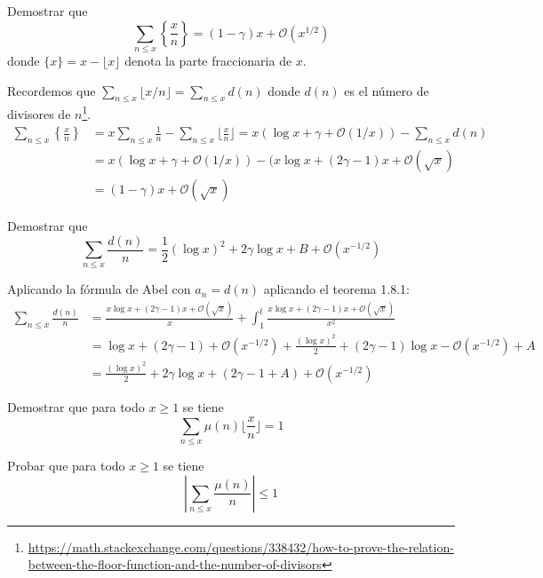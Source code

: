 \documentclass[twoside]{article}
\begin{document}
\begin{ejercicio}{4}
Demostrar que
\[ \sum_{n≤x} \left\{ \frac{x}{n} \right\} = (1-γ)x + \mathcal{O}(x^{1/2}) \]
donde $\{x\}=x-\lfloor x \rfloor$ denota la parte fraccionaria de $x$.
\end{ejercicio}
\begin{sol}
Recordemos que $\sum_{n≤x} \lfloor x/n \rfloor = \sum_{n≤x} d(n)$ donde $d(n)$ es el número de divisores de $n$\footnote{\url{https://math.stackexchange.com/questions/338432/how-to-prove-the-relation-between-the-floor-function-and-the-number-of-divisors}}.
\begin{align*}
	\sum_{n≤x} \left\{ \frac{x}{n} \right\} & = x\sum_{n≤x} \frac{1}{n} - \sum_{n≤x} \lfloor \frac{x}{n}\rfloor = x(\log x + γ + \mathcal{O}(1/x))- \sum_{n≤x} d(n)\\
	& = x(\log x + γ + \mathcal{O}(1/x))- (x \log x + (2γ-1)x + \mathcal{O}(\sqrt{x})\\
	& = (1-γ)x + \mathcal{O}(\sqrt{x})
\end{align*}
\end{sol}

\begin{ejercicio}{5}
Demostrar que
\[ \sum_{n≤x} \frac{d(n)}{n} = \frac{1}{2} (\log x)^2 + 2γ\log x + B + \mathcal{O}(x^{-1/2}) \]
\end{ejercicio}
\begin{sol}
Aplicando la fórmula de Abel con $a_n=d(n)$ aplicando el teorema 1.8.1:
\begin{align*}
	\sum_{n≤x} \frac{d(n)}{n} & = \frac{x \log x + (2γ-1)x + \mathcal{O}(\sqrt{x})}{x} + \int_1^t \frac{x \log x + (2γ-1)x + \mathcal{O}(\sqrt{x})}{x^2}\\
	& = \log x + (2γ-1) + \mathcal{O}(x^{-1/2}) + \frac{(\log x)^2}{2} + (2γ-1)\log x - \mathcal{O}(x^{-1/2}) + A\\
	& = \frac{(\log x)^2}{2} + 2γ\log x + (2γ-1 + A) + \mathcal{O}(x^{-1/2})
\end{align*}
\end{sol}

\begin{ejercicio}{6}
Demostrar que para todo $x ≥ 1$ se tiene
\[ \sum_{n≤x} μ(n) \lfloor \frac{x}{n} \rfloor = 1 \]
\end{ejercicio}
\begin{sol}
\end{sol}

\begin{ejercicio}{7}
Probar que para todo $x ≥ 1$ se tiene
\[ \left|\sum_{n≤x} \frac{μ(n)}{n}\right| ≤ 1 \]
\end{ejercicio}
\begin{sol}
\end{sol}
\end{document}
